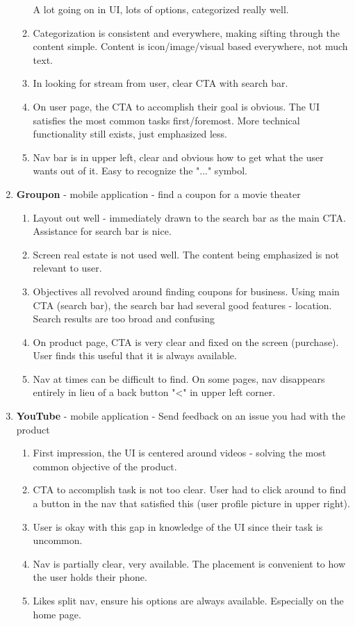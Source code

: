 \begin{enumerate}
\begin{enumerate}
    A lot going on in UI, lots of options, categorized really well.
  \item
    Categorization is consistent and everywhere, making sifting through the content simple. Content is icon/image/visual based everywhere, not much text.
  \item
    In looking for stream from user, clear CTA with search bar.
  \item
    On user page, the CTA to accomplish their goal is obvious. The UI satisfies the most common tasks first/foremost. More technical functionality still exists, just emphasized less.
  \item
    Nav bar is in upper left, clear and obvious how to get what the user wants out of it. Easy to recognize the "..." symbol.
  \end{enumerate}
\item
  \textbf{Groupon} - mobile application - find a coupon for a movie theater
  \begin{enumerate}
  \item
    Layout out well - immediately drawn to the search bar as the main CTA. Assistance for search bar is nice.
  \item
    Screen real estate is not used well. The content being emphasized is not relevant to user.
  \item
    Objectives all revolved around finding coupons for business. Using main CTA (search bar), the search bar had several good features - location. Search results are too broad and confusing
  \item
    On product page, CTA is very clear and fixed on the screen (purchase). User finds this useful that it is always available.
  \item
    Nav at times can be difficult to find. On some pages, nav disappears entirely in lieu of a back button "<" in upper left corner.
  \end{enumerate}
\item
  \textbf{YouTube} - mobile application - Send feedback on an issue you had with the product
  \begin{enumerate}
  \item
    First impression, the UI is centered around videos - solving the most common objective of the product.
  \item
    CTA to accomplish task is not too clear. User had to click around to find a button in the nav that satisfied this (user profile picture in upper right).
  \item
    User is okay with this gap in knowledge of the UI since their task is uncommon.
  \item
    Nav is partially clear, very available. The placement is convenient to how the user holds their phone.
  \item
    Likes split nav, ensure his options are always available. Especially on the home page.
  \end{enumerate}
\end{enumerate}


